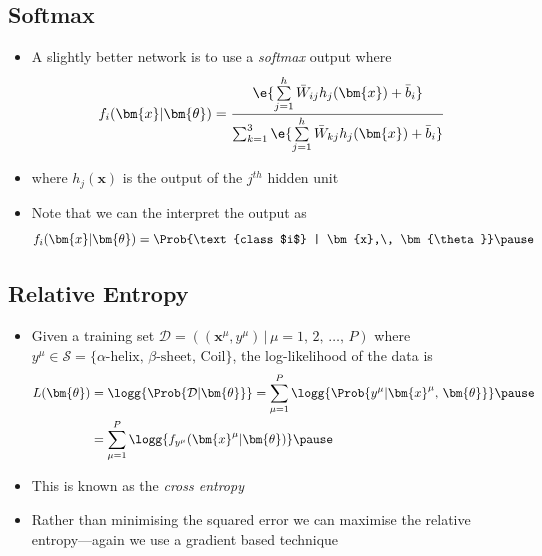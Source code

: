 
\begin{slide}
\section{Softmax}

\begin{PauseHighLight}
  \begin{itemize}
  \item A slightly better network is to use a \emph{softmax} output
    where
    \begin{align*}
      f_i(\bm{x} | \bm{\theta}) = \frac{
      \e{\sum\limits_{j=1}^h \bar{W}_{ij} h_j(\bm{x})+\bar{b}_i} }{
      \sum_{k=1}^3 \e{\sum\limits_{j=1}^h \bar{W}_{kj} h_j(\bm{x})+\bar{b}_i} }
    \end{align*}
  \item where $h_j(\bm{x})$ is the output of the $j^{th}$ hidden
    unit\pause
  \item Note that we can the interpret the output as
    \begin{align*}
      f_i(\bm{x} | \bm{\theta}) = 
      \Prob{\text{class $i$} | \bm{x},\, \bm{\theta}}\pause
    \end{align*}
  \end{itemize}
\end{PauseHighLight}

\end{slide}


\begin{slide}
\section{Relative Entropy}

\begin{PauseHighLight}
  \begin{itemize}
  \item Given a training set $\mathcal{D} = \left( (\bm{x}^\mu,
      y^\mu) \, \big\vert \, \mu  = 1,\,2,\, \ldots,\, P \right)$ where
    $y^\mu\in \mathcal{S} = \{\text{$\alpha$-helix, $\beta$-sheet,
      Coil}\}$,\pause{} the log-likelihood of the data is
      \begin{align*}
        L(\bm{\theta}) &= \logg{\Prob{\mathcal{D}|\bm{\theta}}}
        = \sum_{\mu=1}^P \logg{\Prob{y^\mu|\bm{x}^\mu,\,
                         \bm{\theta}}}\pause \\
        &= \sum_{\mu=1}^P \logg{f_{y^\mu}(\bm{x}^\mu | \bm{\theta})}\pause
      \end{align*}
    \item This is known as the \emph{cross entropy}\pause
    \item Rather than minimising the squared error we can maximise the
      relative entropy\pause---again we use a gradient based technique\pause
  \end{itemize}
\end{PauseHighLight}

\end{slide}



